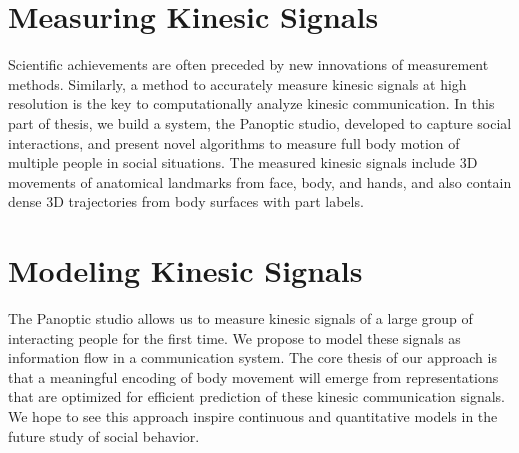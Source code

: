 \documentclass[oneside,letterpaper]{memoir}
\makeatletter
\renewcommand\listoffigures{%
	\@starttoc{lot}%
}
\renewcommand\listoftables{%
	\@starttoc{lot}%
}
\makeatother
\begin{document}

\newpage
{}
\tableofcontents
{}

\mainmatter




\part{Measuring Kinesic Signals}

Scientific achievements are often preceded by new innovations of measurement methods. Similarly, a method to accurately measure kinesic signals at high resolution is the key to computationally analyze kinesic communication. In this part of thesis, we build a system, the Panoptic studio, developed to capture social interactions, and present novel algorithms to measure full body motion of multiple people in social situations. The measured kinesic signals include 3D movements of anatomical landmarks from face, body, and hands, and also contain dense 3D trajectories from body surfaces with part labels. 
\pagebreak






\part{Modeling Kinesic Signals}

The Panoptic studio allows us to measure kinesic signals of a large group of interacting people for the first time. We propose to model these signals as information flow in a communication system. The core thesis of our approach is that a meaningful encoding of body movement will emerge from representations that are optimized for efficient prediction of these kinesic communication signals. We hope to see this approach inspire continuous and quantitative models in the future study of social behavior. 
\end{document}
